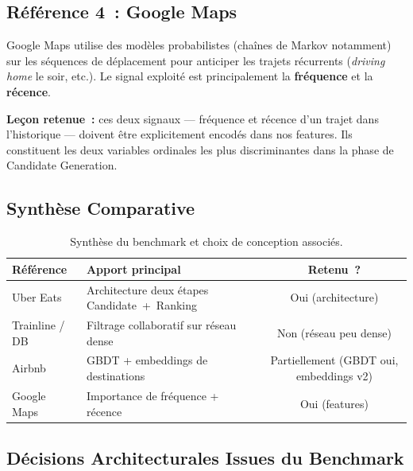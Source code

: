 \documentclass[11pt, a4paper]{article}
\begin{document}
\subsection{Référence 4~: Google Maps}

Google Maps utilise des modèles probabilistes (chaînes de Markov
notamment) sur les séquences de déplacement pour anticiper les trajets
récurrents (\textit{driving home} le soir, etc.). Le signal exploité
est principalement la \textbf{fréquence} et la \textbf{récence}.

\textbf{Leçon retenue~:} ces deux signaux --- fréquence et récence
d'un trajet dans l'historique --- doivent être explicitement encodés
dans nos features. Ils constituent les deux variables ordinales les
plus discriminantes dans la phase de Candidate Generation.

\subsection{Synthèse Comparative}

\begin{table}[h]
\centering
\small
\begin{tabularx}{\textwidth}{|l|X|c|}
\hline
\textbf{Référence} & \textbf{Apport principal} & \textbf{Retenu~?} \\
\hline
Uber Eats          & Architecture deux étapes Candidate~+~Ranking & Oui (architecture) \\
\hline
Trainline / DB     & Filtrage collaboratif sur réseau dense       & Non (réseau peu dense) \\
\hline
Airbnb             & GBDT + embeddings de destinations            & Partiellement (GBDT oui, embeddings v2) \\
\hline
Google Maps        & Importance de fréquence + récence            & Oui (features) \\
\hline
\end{tabularx}
\caption{Synthèse du benchmark et choix de conception associés.}
\end{table}

\subsection{Décisions Architecturales Issues du Benchmark}
\end{document}
